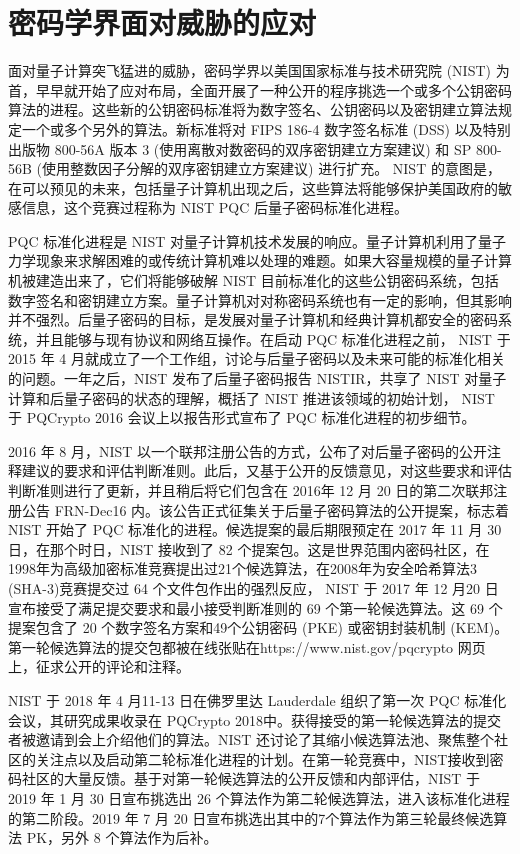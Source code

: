 \section{密码学界面对威胁的应对}


面对量子计算突飞猛进的威胁，密码学界以美国国家标准与技术研究院 (NIST) 为首，早早就开始了应对布局，全面开展了一种公开的程序挑选一个或多个公钥密码算法的进程。这些新的公钥密码标准将为数字签名、公钥密码以及密钥建立算法规定一个或多个另外的算法。新标准将对 FIPS 186-4 数字签名标准 (DSS) 以及特别出版物 800-56A 版本 3 (使用离散对数密码的双序密钥建立方案建议) 和 SP 800-56B (使用整数因子分解的双序密钥建立方案建议) 进行扩充。 NIST 的意图是，在可以预见的未来，包括量子计算机出现之后，这些算法将能够保护美国政府的敏感信息，这个竞赛过程称为 NIST PQC 后量子密码标准化进程。

PQC 标准化进程是 NIST 对量子计算机技术发展的响应。量子计算机利用了量子力学现象来求解困难的或传统计算机难以处理的难题。如果大容量规模的量子计算机被建造出来了，它们将能够破解 NIST 目前标准化的这些公钥密码系统，包括数字签名和密钥建立方案。量子计算机对对称密码系统也有一定的影响，但其影响并不强烈。后量子密码的目标，是发展对量子计算机和经典计算机都安全的密码系统，并且能够与现有协议和网络互操作。在启动 PQC 标准化进程之前， NIST 于 2015 年 4 月就成立了一个工作组，讨论与后量子密码以及未来可能的标准化相关的问题。一年之后，NIST 发布了后量子密码报告 NISTIR，共享了 NIST 对量子计算和后量子密码的状态的理解，概括了 NIST 推进该领域的初始计划， NIST 于 PQCrypto 2016 会议上以报告形式宣布了 PQC 标准化进程的初步细节。

2016 年 8 月，NIST 以一个联邦注册公告的方式，公布了对后量子密码的公开注释建议的要求和评估判断准则。此后，又基于公开的反馈意见，对这些要求和评估判断准则进行了更新，并且稍后将它们包含在 2016年 12 月 20 日的第二次联邦注册公告 FRN-Dec16 内。该公告正式征集关于后量子密码算法的公开提案，标志着 NIST 开始了 PQC 标准化的进程。候选提案的最后期限预定在 2017 年 11 月 30 日，在那个时日，NIST 接收到了 82 个提案包。这是世界范围内密码社区，在1998年为高级加密标准竞赛提出过21个候选算法，在2008年为安全哈希算法3 (SHA-3)竞赛提交过 64 个文件包作出的强烈反应， NIST 于 2017 年 12 月20 日宣布接受了满足提交要求和最小接受判断准则的 69 个第一轮候选算法。这 69 个提案包含了 20 个数字签名方案和49个公钥密码 (PKE) 或密钥封装机制 (KEM)。第一轮候选算法的提交包都被在线张贴在https://www.nist.gov/pqcrypto 网页上，征求公开的评论和注释。

NIST 于 2018 年 4 月11-13 日在佛罗里达 Lauderdale 组织了第一次 PQC 标准化会议，其研究成果收录在 PQCrypto 2018中。获得接受的第一轮候选算法的提交者被邀请到会上介绍他们的算法。NIST 还讨论了其缩小候选算法池、聚焦整个社区的关注点以及启动第二轮标准化进程的计划。在第一轮竞赛中，NIST接收到密码社区的大量反馈。基于对第一轮候选算法的公开反馈和内部评估，NIST 于 2019 年 1 月 30 日宣布挑选出 26 个算法作为第二轮候选算法，进入该标准化进程的第二阶段。2019 年 7 月 20 日宣布挑选出其中的7个算法作为第三轮最终候选算法 PK，另外 8 个算法作为后补。

